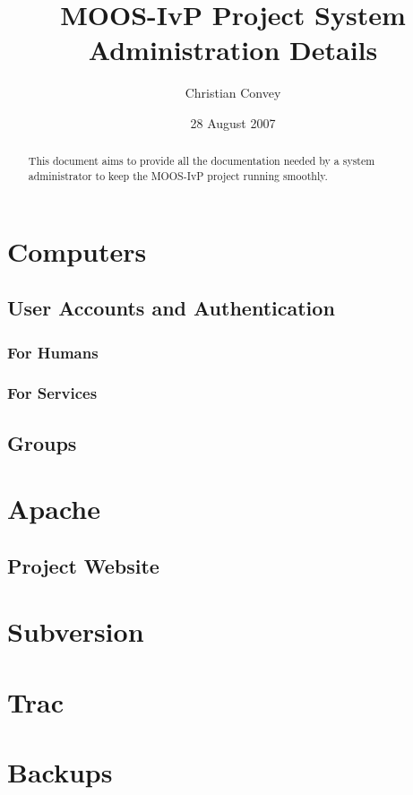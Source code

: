 \documentclass[letterpaper,10pt]{article}
\title{MOOS-IvP Project System Administration Details}
\author{Christian Convey}
\date{28 August 2007}
\begin{document}
\maketitle

\begin{abstract}
This document aims to provide all the documentation needed by a system administrator to keep
the MOOS-IvP project running smoothly.
\end{abstract}


\tableofcontents

\section{Computers}
\subsection{User Accounts and Authentication}
\subsubsection{For Humans}
\subsubsection{For Services}
\subsection{Groups}

\section{Apache}
\subsection{Project Website}

\section{Subversion}

\section{Trac}

\section{Backups}
\end{document}
